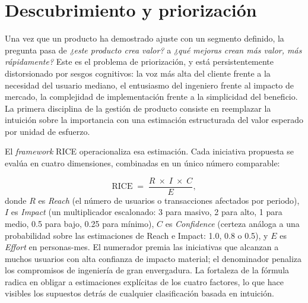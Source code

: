 \section{Descubrimiento y priorización}\label{sec:product-discovery}

Una vez que un producto ha demostrado ajuste con un segmento definido, la pregunta pasa
de \emph{¿este producto crea valor?} a \emph{¿qué mejoras crean más valor, más
rápidamente?} Este es el problema de priorización, y está persistentemente distorsionado
por sesgos cognitivos: la voz más alta del cliente frente a la necesidad del usuario
mediano, el entusiasmo del ingeniero frente al impacto de mercado, la complejidad de
implementación frente a la simplicidad del beneficio. La primera disciplina de la gestión
de producto consiste en reemplazar la intuición sobre la importancia con una estimación
estructurada del valor esperado por unidad de esfuerzo.

El \emph{framework} RICE operacionaliza esa estimación. Cada iniciativa propuesta se
evalúa en cuatro dimensiones, combinadas en un único número comparable:

\begin{equation}\label{eq:rice}
  \mathrm{RICE} \;=\; \frac{R \;\times\; I \;\times\; C}{E},
\end{equation}
donde \(R\) es \emph{Reach} (el número de usuarios o transacciones afectados por
periodo), \(I\) es \emph{Impact} (un multiplicador escalonado: 3 para masivo, 2 para
alto, 1 para medio, 0.5 para bajo, 0.25 para mínimo), \(C\) es \emph{Confidence}
(certeza análoga a una probabilidad sobre las estimaciones de Reach e Impact: 1.0, 0.8
o 0.5), y \(E\) es \emph{Effort} en personas-mes. El numerador premia las iniciativas
que alcanzan a muchos usuarios con alta confianza de impacto material; el denominador
penaliza los compromisos de ingeniería de gran envergadura. La fortaleza de la fórmula
radica en obligar a estimaciones explícitas de los cuatro factores, lo que hace visibles
los supuestos detrás de cualquier clasificación basada en intuición.

